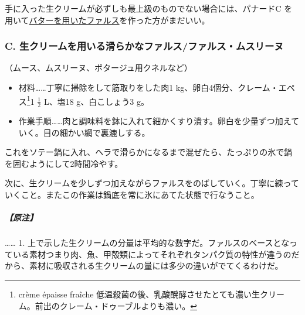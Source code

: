 \begin{recette}
手に入った生クリームが必ずしも最上級のものでない場合には、パナードC
を用いて\protect\hyperlink{farce-a}{バターを用いたファルス}を作った方がまだいい。

\hypertarget{farce-c}{%
\subsubsection{C.
生クリームを用いる滑らかなファルス/ファルス・ムスリーヌ}\label{farce-c}}



（ムース、ムスリーヌ、ポタージュ用クネルなど）

\begin{itemize}
\item
  材料\ldots{}\ldots{}丁寧に掃除をして筋取りをした肉1
  kg、卵白4個分、クレーム・エペス\footnote{crème épaisse fraîche
    低温殺菌の後、乳酸醗酵させたとても濃い生クリーム。前出のクレーム・ドゥーブルよりも濃い。}1
  \(\frac{1}{2}\) L、塩18 g、白こしょう3 g。
\item
  作業手順\ldots{}\ldots{}肉と調味料を鉢に入れて細かくすり潰す。卵白を少量ずつ加えていく。目の細かい網で裏漉しする。
\end{itemize}

これをソテー鍋に入れ、ヘラで滑らかになるまで混ぜたら、たっぷりの氷で鍋を囲むようにして2時間冷やす。

次に、生クリームを少しずつ加えながらファルスをのばしていく。丁寧に練っていくこと。またこの作業は鍋底を常に氷にあてた状態で行なうこと。

\hypertarget{nota-farce-c}{%
\subparagraph{【原注】}\label{nota-farce-c}}

\ldots{}\ldots{} 1.
上で示した生クリームの分量は平均的な数字だ。ファルスのベースとなっている素材つまり肉、魚、甲殻類によってそれぞれタンパク質の特性が違うのだから、素材に吸収される生クリームの量には多少の違いがでてくるわけだ。


\end{recette}
